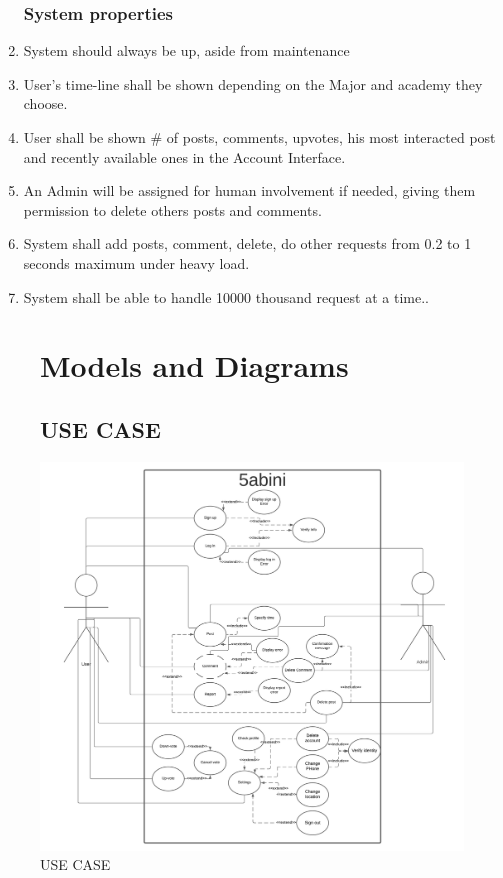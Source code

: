 \documentclass[12pt]{article}
\begin{document}
\begin{enumerate}
\subsubsection*{System properties}
\item System should always be up, aside from maintenance

\item User's time-line shall be shown depending on the Major and academy they choose.
\item User shall be shown \# of posts, comments, upvotes, his most interacted post and recently available ones in the Account Interface.
\item An Admin will be assigned for human involvement if needed, giving them permission to delete others posts and comments.
\item System shall add posts, comment, delete, do other requests from 0.2 to 1 seconds maximum under heavy load.
\item System shall be able to handle 10000 thousand request at a time..
\end{enumerate}
\sectionbreak

\begin{figure}[b]
\section{Models and Diagrams}
\subsection{USE CASE}
\centerline{\includegraphics[width=1.4\textwidth]{./USECASE/5abiniUseCase.png}}
\caption{USE CASE}
\end{figure}
\twocolumn
\end{document}
